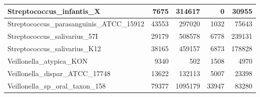 \documentclass[12pt,a4paper]{article}
\begin{document}
\begin{table}[ht]
\begin{center}
\begin{tabular}{|l*{4}{|r}|}
Streptococcus\_infantis\_X & 7675 & 314617 & 0 & 30955 \\ \hline
Streptococcus\_parasanguinis\_ATCC\_15912 & 43553 & 297020 & 1032 & 75643 \\ \hline
Streptococcus\_salivarius\_57I & 29179 & 508578 & 6778 & 239131 \\ \hline
Streptococcus\_salivarius\_K12 & 38165 & 459157 & 6873 & 178828 \\ \hline
Veillonella\_atypica\_KON & 9340 & 502 & 1508 & 4970 \\ \hline
Veillonella\_dispar\_ATCC\_17748 & 13622 & 132113 & 5007 & 23398 \\ \hline
Veillonella\_sp\_oral\_taxon\_158 & 79377 & 1095179 & 33947 & 83280 \\ \hline
\end{tabular}
\end{center}
\end{table}
\end{document}
